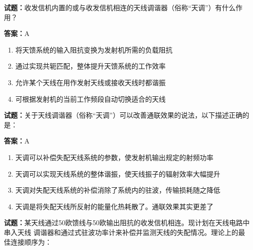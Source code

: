 \documentclass{ctexbook}
\begin{document}


\vspace{1em}

\textbf{试题：}收发信机内置的或与收发信机相连的天线调谐器（俗称“天调”）有什么作用？ 

\textbf{答案：}A 

\begin{enumerate}[leftmargin=3em]
  \item 将天馈系统的输入阻抗变换为发射机所需的负载阻抗 

  \item 通过实现共轭匹配，整体提升天馈系统的工作效率 

  \item 允许某个天线在用作发射天线或接收天线时都谐振 

  \item 可根据发射机的当前工作频段自动切换适合的天线 

\end{enumerate}





\vspace{1em}

\textbf{试题：}关于天线调谐器（俗称“天调”）可以改善通联效果的说法，以下描述正确的是： 

\textbf{答案：}A 

\begin{enumerate}[leftmargin=3em]
  \item 天调可以补偿失配天线系统的参数，使发射机输出规定的射频功率 

  \item 天调可以实现天线系统的整体谐振，使天线振子的辐射效率大幅提升 

  \item 天调对失配天线系统的补偿消除了系统内的驻波，传输损耗随之降低 

  \item 天调是将失配天线所反射的能量化热耗散了。通联效果其实更差了 

\end{enumerate}






\vspace{1em}

\textbf{试题：}某天线通过50欧馈线与50欧输出阻抗的收发信机相连。现计划在天线电路中串入天线
调谐器和通过式驻波功率计来补偿并监测天线的失配情况。理论上的最佳连接顺序为： 
\end{document}
